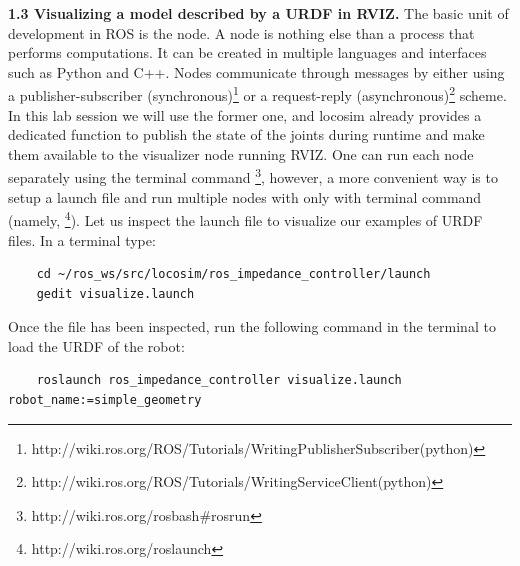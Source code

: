 \documentclass[11pt]{article}
\begin{document}
\textbf{1.3 Visualizing a model described by a URDF in RVIZ.} The basic unit of development in ROS is the node. A node is nothing else than a process that performs computations. It can be created in multiple languages and interfaces such as Python and C++. Nodes communicate through messages by either using a publisher-subscriber (synchronous)\footnote{http://wiki.ros.org/ROS/Tutorials/WritingPublisherSubscriber(python)} or a request-reply (asynchronous)\footnote{http://wiki.ros.org/ROS/Tutorials/WritingServiceClient(python)} scheme. In this lab session we will use the former one, and locosim already provides a dedicated function to publish the state of the joints during runtime and make them available to the visualizer node running RVIZ. One can run each node separately using the terminal command \footnote{http://wiki.ros.org/rosbash\#rosrun}, however, a more convenient way is to setup a launch file and run multiple nodes with only with terminal command (namely, \footnote{http://wiki.ros.org/roslaunch}). Let us inspect the launch file to visualize our examples of URDF files. In a terminal type:
%
\begin{verbatim}
	cd ~/ros_ws/src/locosim/ros_impedance_controller/launch
	gedit visualize.launch
\end{verbatim}
%
Once the file has been inspected,  run the following command in the terminal to load the URDF of the  robot:

\footnotesize
\begin{verbatim}
	roslaunch ros_impedance_controller visualize.launch robot_name:=simple_geometry 
\end{verbatim}
\normalsize
\end{document}
